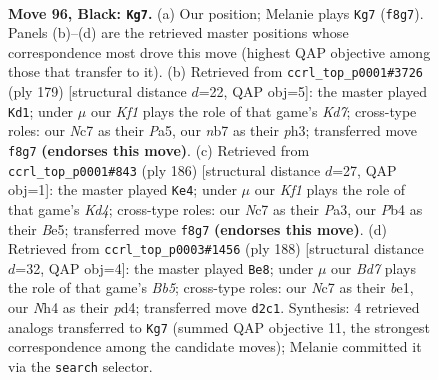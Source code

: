 \documentclass[11pt]{article}
\begin{document}
\clearpage

\begin{figure}[p]\centering
\begin{subfigure}{0.46\textwidth}\centering
\resizebox{\linewidth}{!}{%
\newchessgame
\chessboard[
  setfen={5k2/1Nn5/8/8/Pp2P2n/4p3/K1Bb3p/8 b - - 1 96},
  showmover=false,
  pgfstyle=straightmove, color=movearrow, markmove={f8-g7}
]}
\caption{}
\end{subfigure}\hfill
\begin{subfigure}{0.46\textwidth}\centering
\resizebox{\linewidth}{!}{%
\newchessgame
\chessboard[
  setfen={8/8/2B5/p3p3/P1K1P2p/6bP/3k4/8 b - - 76 90},
  showmover=false,
  pgfstyle=straightmove, color=movearrow, markmove={d2-d1}
]}
\caption{}
\end{subfigure}
\\[4pt]
\begin{subfigure}{0.46\textwidth}\centering
\resizebox{\linewidth}{!}{%
\newchessgame
\chessboard[
  setfen={8/1p1b4/6k1/1p2B3/3K4/P7/1P5P/8 w - - 45 94},
  showmover=false,
  pgfstyle=straightmove, color=movearrow, markmove={d4-e4}
]}
\caption{}
\end{subfigure}\hfill
\begin{subfigure}{0.46\textwidth}\centering
\resizebox{\linewidth}{!}{%
\newchessgame
\chessboard[
  setfen={8/8/8/pB2k3/P2p2K1/3P4/2P5/4b3 w - - 51 95},
  showmover=false,
  pgfstyle=straightmove, color=movearrow, markmove={b5-e8}
]}
\caption{}
\end{subfigure}
\caption{\textbf{Move 96, Black: \texttt{Kg7}.} (a) Our position; Melanie plays \texttt{Kg7} (\texttt{f8g7}). Panels (b)--(d) are the retrieved master positions whose correspondence most drove this move (highest QAP objective among those that transfer to it). (b) Retrieved from \texttt{ccrl\_top\_p0001\#3726} (ply 179) [structural distance $d$=22, QAP obj=5]: the master played \texttt{Kd1}; under $\mu$ our \emph{Kf1} plays the role of that game's \emph{Kd7}; cross-type roles: our \emph{N}c7 as their \emph{P}a5, our \emph{n}b7 as their \emph{p}h3; transferred move \texttt{f8g7} \textbf{(endorses this move)}. (c) Retrieved from \texttt{ccrl\_top\_p0001\#843} (ply 186) [structural distance $d$=27, QAP obj=1]: the master played \texttt{Ke4}; under $\mu$ our \emph{Kf1} plays the role of that game's \emph{Kd4}; cross-type roles: our \emph{N}c7 as their \emph{P}a3, our \emph{P}b4 as their \emph{B}e5; transferred move \texttt{f8g7} \textbf{(endorses this move)}. (d) Retrieved from \texttt{ccrl\_top\_p0003\#1456} (ply 188) [structural distance $d$=32, QAP obj=4]: the master played \texttt{Be8}; under $\mu$ our \emph{Bd7} plays the role of that game's \emph{Bb5}; cross-type roles: our \emph{N}c7 as their \emph{b}e1, our \emph{N}h4 as their \emph{p}d4; transferred move \texttt{d2c1}. Synthesis: 4 retrieved analogs transferred to \texttt{Kg7} (summed QAP objective 11, the strongest correspondence among the candidate moves); Melanie committed it via the \texttt{search} selector.}
\label{fig:thought-m191}
\end{figure}
\end{document}
